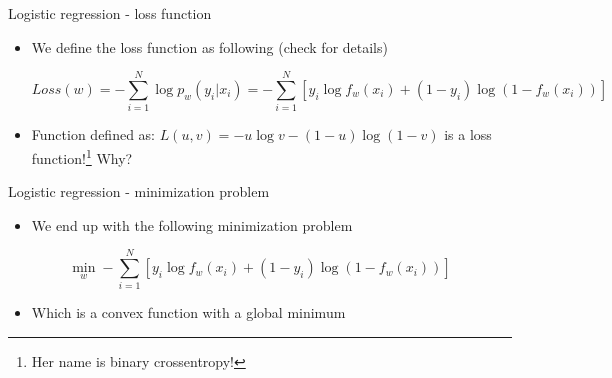 \documentclass[aspectratio=169]{beamer}
\begin{document}
\begin{frame}{Logistic regression - loss function}
    \begin{itemize}
        \item We define the loss function as following (check \cite{Bishop, Murphy} for details)
    

    $$
    Loss(w) = - \sum_{i=1}^{N}\log p_w(y_i|x_i) = - \sum_{i=1}^{N}[y_i \log f_w(x_i) + (1 - y_i)\log (1-f_w(x_i))]
    $$
    \item Function defined as: $L(u, v) = -u\log v - (1-u)\log (1-v)$ is a loss function!\footnote{Her name is binary crossentropy!} Why?
    \end{itemize}
\end{frame}
\begin{frame}{Logistic regression - minimization problem}
    \begin{itemize}
        \item We end up with the following minimization problem
    \end{itemize}
    $$
    \min_w - \sum_{i=1}^{N}[y_i \log f_w(x_i) + (1 - y_i)\log (1-f_w(x_i))]
    $$
    \begin{itemize}
        \item Which is a convex function with a global minimum
    \end{itemize}
\end{frame}
\end{document}
